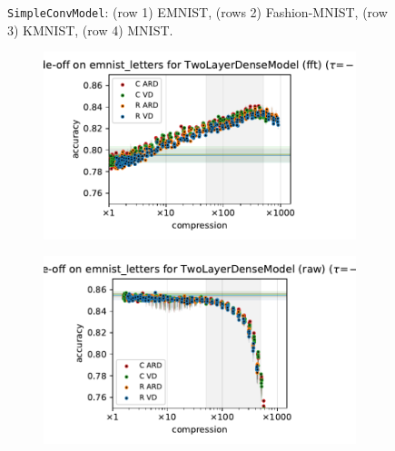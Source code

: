\documentclass[a4paper,10pt,onecolumn]{article}
\begin{document}
\begin{figure}[b]
\begin{subfigure}[b]{0.5\columnwidth}
  \end{subfigure}
  \caption{%
    \texttt{SimpleConvModel}: (row 1) EMNIST, (rows 2) Fashion-MNIST, (row 3) KMNIST, (row 4) MNIST.
  }
\end{figure}

\begin{figure}[b]
  \centering
  \begin{subfigure}[b]{0.5\columnwidth}
    \centering
    \includegraphics[width=\columnwidth]{figure__mnist-like__method_comparison/appendix__TwoLayerDenseModel__emnist_letters__fft__-0.5.pdf}
  \end{subfigure}%
  \begin{subfigure}[b]{0.5\columnwidth}
    \centering
    \includegraphics[width=\columnwidth]{figure__mnist-like__method_comparison/appendix__TwoLayerDenseModel__emnist_letters__raw__-0.5.pdf}
  \end{subfigure} \\ %
  \begin{subfigure}[b]{0.5\columnwidth}

\end{subfigure}
\end{figure}
\end{document}
